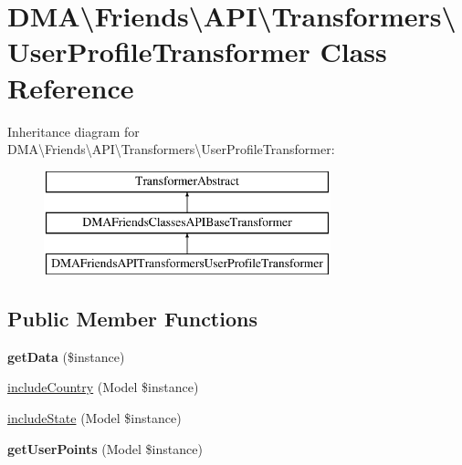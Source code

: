 \hypertarget{classDMA_1_1Friends_1_1API_1_1Transformers_1_1UserProfileTransformer}{}\section{D\+M\+A\textbackslash{}Friends\textbackslash{}A\+P\+I\textbackslash{}Transformers\textbackslash{}User\+Profile\+Transformer Class Reference}
\label{classDMA_1_1Friends_1_1API_1_1Transformers_1_1UserProfileTransformer}
Inheritance diagram for D\+M\+A\textbackslash{}Friends\textbackslash{}A\+P\+I\textbackslash{}Transformers\textbackslash{}User\+Profile\+Transformer\+:\begin{figure}[H]
\begin{center}
\leavevmode
\includegraphics[height=3.000000cm]{d6/d08/classDMA_1_1Friends_1_1API_1_1Transformers_1_1UserProfileTransformer}
\end{center}
\end{figure}
\subsection*{Public Member Functions}
\begin{DoxyCompactItemize}
\item 
\hypertarget{classDMA_1_1Friends_1_1API_1_1Transformers_1_1UserProfileTransformer_ada552f9a08e428c52c044ca8e7abc915}{}{\bfseries get\+Data} (\$instance)\label{classDMA_1_1Friends_1_1API_1_1Transformers_1_1UserProfileTransformer_ada552f9a08e428c52c044ca8e7abc915}

\item 
\hyperlink{classDMA_1_1Friends_1_1API_1_1Transformers_1_1UserProfileTransformer_aaea113bbd8cf8bd53b6ef3530d3fc07a}{include\+Country} (Model \$instance)
\item 
\hyperlink{classDMA_1_1Friends_1_1API_1_1Transformers_1_1UserProfileTransformer_accd7c7ec420193cbaa6077b26aa8d292}{include\+State} (Model \$instance)
\item 
\hypertarget{classDMA_1_1Friends_1_1API_1_1Transformers_1_1UserProfileTransformer_a8e0d4c0e3e2f424792f857292abb0710}{}{\bfseries get\+User\+Points} (Model \$instance)\label{classDMA_1_1Friends_1_1API_1_1Transformers_1_1UserProfileTransformer_a8e0d4c0e3e2f424792f857292abb0710}

\end{DoxyCompactItemize}
